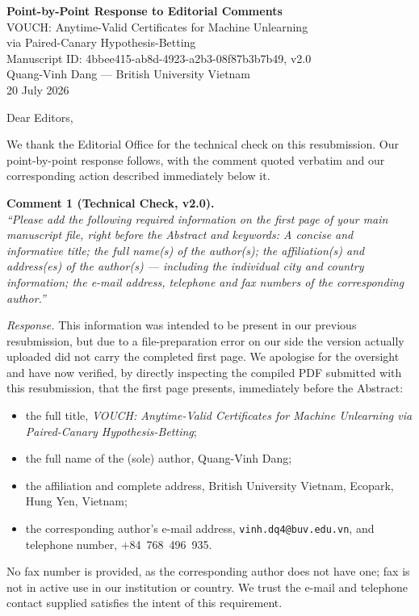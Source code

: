 \documentclass[11pt]{article}
\begin{document}
\begin{center}
{\Large\bfseries Point-by-Point Response to Editorial Comments}\\[6pt]
{\large VOUCH: Anytime-Valid Certificates for Machine Unlearning\\
via Paired-Canary Hypothesis-Betting}\\[4pt]
Manuscript ID: 4bbee415-ab8d-4923-a2b3-08f87b3b7b49, v2.0\\[4pt]
Quang-Vinh Dang --- British University Vietnam\\[4pt]
20 July 2026
\end{center}

\vspace{6pt}
\noindent Dear Editors,

We thank the Editorial Office for the technical check on this resubmission. Our
point-by-point response follows, with the comment quoted verbatim and our
corresponding action described immediately below it.

\vspace{8pt}
\noindent\textbf{Comment 1 (Technical Check, v2.0).}\\
\textit{``Please add the following required information on the first page of your
main manuscript file, right before the Abstract and keywords: A concise and
informative title; the full name(s) of the author(s); the affiliation(s) and
address(es) of the author(s) --- including the individual city and country
information; the e-mail address, telephone and fax numbers of the corresponding
author.''}

\emph{Response.} This information was intended to be present in our previous
resubmission, but due to a file-preparation error on our side the version actually
uploaded did not carry the completed first page. We apologise for the oversight and
have now verified, by directly inspecting the compiled PDF submitted with this
resubmission, that the first page presents, immediately before the Abstract:
\begin{itemize}[nosep,leftmargin=1.4em]
\item the full title, \emph{VOUCH: Anytime-Valid Certificates for Machine Unlearning
via Paired-Canary Hypothesis-Betting};
\item the full name of the (sole) author, Quang-Vinh Dang;
\item the affiliation and complete address, British University Vietnam, Ecopark,
Hung Yen, Vietnam;
\item the corresponding author's e-mail address, \texttt{vinh.dq4@buv.edu.vn}, and
telephone number, +84~768~496~935.
\end{itemize}
No fax number is provided, as the corresponding author does not have one; fax is not
in active use in our institution or country. We trust the e-mail and telephone
contact supplied satisfies the intent of this requirement.
\end{document}
